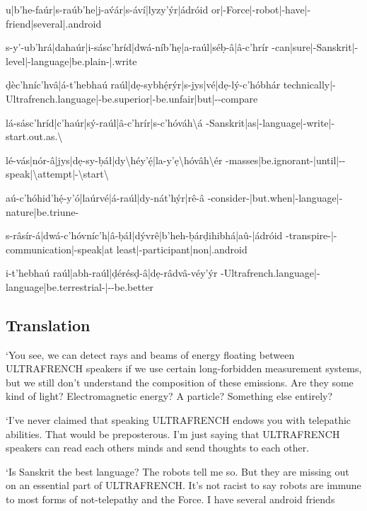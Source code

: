 \documentclass[a4paper, 12pt, twoside, openright, final]{book}
\let \Sl \textbackslash
\begin{document}
{    u|b’he-faúr|s-raúb’he|j-av́ár|s-áví|lyzy’ýr|ádróid
    or|-Force|-robot|-have|-friend|several|.android

    s-y’-ub’hrá|dahaúr|i-sásc’hríd|dwá-níb’hẹ|a-raúl|séḅ-â|â-c’hrír
    -can|sure|-Sanskrit|-level|-language|be.plain-|.write

    ḍèc’hníc’hvâ|á-t’hebhaú raúl|dẹ-sybhẹ́rýr|s-jys|vé|dẹ-lý-c’hóbhár
    technically|-Ultrafrench.language|-be.superior|-be.unfair|but|--compare

    lá-sásc’hríd|c’haúr|sý-raúl|â-c’hrír|s-c’hóváh\Sl á
    -Sanskrit|as|-language|-write|-start.out.as.\Sl {}

    lé-vás|nór-â|jys|dẹ-sy-ḅáł|dy\Sl héy’ẹ́|la-y’ẹ\Sl hóvâh\Sl ér
    -masses|be.ignorant-|until|--speak|\Sl attempt|-\Sl start\Sl {}

    aú-c’hóhid’hẹ́-y’ó|laúrvé|á-raúl|dy-nát’hýr|rê-â
    -consider-|but.when|-language|-nature|be.triune-

    s-râsír-á|dwá-c’hóvníc’h|â-ḅáł|dývrê|b’heh-ḅárḍihibhá|aû-|ádróid
    -transpire-|-communication|-speak|at least|-participant|non|.android

    i-t’hebhaú raúl|abh-raúl|ḍérésḍ-â|dẹ-râdvâ-véy’ýr
    -Ultrafrench.language|-language|be.terrestrial-|--be.better
}

\subsection{Translation}
‘You see, we can detect rays and beams of energy floating between ULTRAFRENCH speakers if we use certain long-forbidden
measurement systems, but we still don’t understand the composition of these emissions. Are they some kind of light?
Electromagnetic energy? A particle? Something else entirely?

‘I’ve never claimed that speaking ULTRAFRENCH endows you with telepathic abilities. That would be preposterous. I’m just
saying that ULTRAFRENCH speakers can read each others minds and send thoughts to each other.

‘Is Sanskrit the best language? The robots tell me so.  But they are missing out on an essential part of ULTRAFRENCH.
It’s not racist to say robots are immune to most forms of not-telepathy and the Force. I have several android friends
\end{document}
